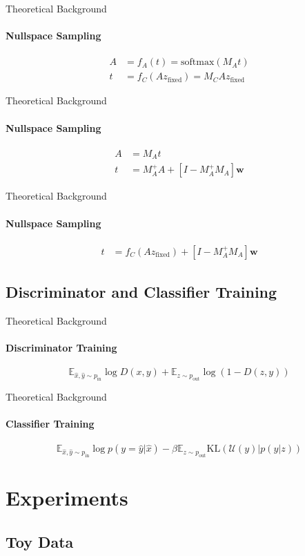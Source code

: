 \documentclass[aspectratio=169]{beamer}
\begin{document}
\begin{frame}{Theoretical Background}
   \framesubtitle{Nullspace Sampling}
\begin{align*}
    A &= f_A(t) = \mathrm{softmax}(M_A t) \\
    t &= f_C(Az_{\mathrm{fixed}}) = M_C A z_{\mathrm{fixed}}
\end{align*}
\end{frame}

\begin{frame}{Theoretical Background}
   \framesubtitle{Nullspace Sampling}
\begin{align*}
    A &= M_A t \\
    t &= M_A^+ A + [I - M_A^+ M_A] \mathbf{w}
\end{align*}
\end{frame}

\begin{frame}{Theoretical Background}
   \framesubtitle{Nullspace Sampling}
\begin{align*}
    t &= f_C(Az_{\mathrm{fixed}}) + [I - M_A^+ M_A] \mathbf{w}
\end{align*}
\end{frame}

\subsection{Discriminator and Classifier Training}
\begin{frame}{Theoretical Background}
   \framesubtitle{Discriminator Training}
\begin{equation}
	\mathbb{E}_{\hat{x}, \hat{y} \sim p_{\mathrm{in}}} \log D(x, y) +
	\mathbb{E}_{z \sim p_{\mathrm{out}}} \log ( 1 - D(z, y) )
\end{equation}
\end{frame}
\begin{frame}{Theoretical Background}
   \framesubtitle{Classifier Training}
\begin{equation}
	\mathbb{E}_{\hat{x}, \hat{y} \sim p_{\mathrm{in}}} \log p(y=\hat{y} | \hat{x}) -
	\beta \mathbb{E}_{z \sim p_{\mathrm{out}}} \mathrm{KL}(\mathcal{U}(y) | p(y | z))
\end{equation}
\end{frame}


\section{Experiments}

\subsection{Toy Data}
\end{document}
